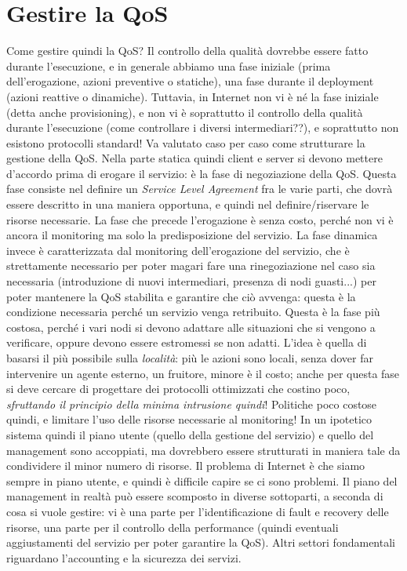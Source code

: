 \section{Gestire la QoS}
Come gestire quindi la QoS? Il controllo della qualità dovrebbe essere fatto
durante l'esecuzione, e in generale
abbiamo una fase iniziale (prima dell'erogazione, azioni preventive o statiche),
una fase durante il deployment
(azioni reattive o dinamiche). Tuttavia, in Internet non vi è né la fase
iniziale (detta anche provisioning), e non
vi è soprattutto il controllo della qualità durante l'esecuzione (come
controllare i diversi intermediari??), e
soprattutto non esistono protocolli standard! Va valutato caso per caso come
strutturare la gestione della QoS.
Nella parte statica quindi client e server si devono mettere d'accordo prima di
erogare il servizio: è la fase di
negoziazione della QoS. Questa fase consiste nel definire un \textit{Service
Level Agreement} fra le varie parti,
che dovrà essere descritto in una maniera opportuna, e quindi nel
definire/riservare le risorse necessarie. La fase
che precede l'erogazione è senza costo, perché non vi è ancora il monitoring ma
solo la predisposizione del servizio.
La fase dinamica invece è caratterizzata dal monitoring dell'erogazione del
servizio, che è strettamente necessario
per poter magari fare una rinegoziazione nel caso sia necessaria (introduzione
di nuovi intermediari, presenza di
nodi guasti...) per poter mantenere la QoS stabilita e garantire che ciò
avvenga: questa è la condizione necessaria
perché un servizio venga retribuito. Questa è la fase più costosa, perché i vari
nodi si devono adattare alle
situazioni che si vengono a verificare, oppure devono essere estromessi se non
adatti. L'idea è quella di basarsi il
più possibile sulla \textit{località}: più le azioni sono locali, senza dover
far intervenire un agente esterno, un
fruitore, minore è il costo; anche per questa fase si deve cercare di progettare
dei protocolli ottimizzati che
costino poco, \textit{sfruttando il principio della minima intrusione quindi}!
Politiche poco costose quindi, e
limitare l'uso delle risorse necessarie al monitoring! In un ipotetico sistema
quindi il piano utente (quello della
gestione del servizio) e quello del management sono accoppiati, ma dovrebbero
essere strutturati in maniera tale da
condividere il minor numero di risorse. Il problema di Internet è che siamo
sempre in piano utente, e quindi è
difficile capire se ci sono problemi.
Il piano del management in realtà può essere scomposto in diverse sottoparti, a
seconda di cosa si vuole gestire: vi
è una parte per l'identificazione di fault e recovery delle risorse, una parte
per il controllo della performance
(quindi eventuali aggiustamenti del servizio per poter garantire la QoS). Altri
settori fondamentali riguardano
l'accounting e la sicurezza dei servizi.

